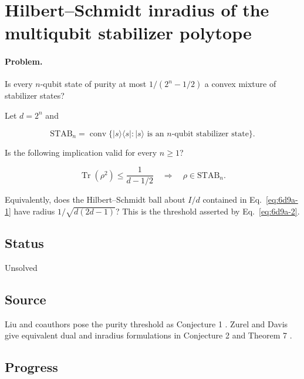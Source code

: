 \section{Hilbert--Schmidt inradius of the multiqubit stabilizer polytope}
\label{sec:op_6d9a72b32070a900}

\paragraph{Problem.}
Is every $n$-qubit state of purity at most $1/(2^n-1/2)$ a convex mixture of stabilizer states?

Let $d=2^n$ and

\begin{equation}
\mathrm{STAB}_n=\operatorname{conv}\{|s\rangle\langle s|:|s\rangle\text{ is an }n\text{-qubit stabilizer state}\}.
\label{eq:6d9a-1}
\end{equation}

Is the following implication valid for every $n\geq1$?

\begin{equation}
\operatorname{Tr}(\rho^2)\leq\frac1{d-1/2}
\quad\Longrightarrow\quad
\rho\in\mathrm{STAB}_n.
\label{eq:6d9a-2}
\end{equation}

Equivalently, does the Hilbert--Schmidt ball about $I/d$ contained in Eq.~\eqref{eq:6d9a-1} have radius $1/\sqrt{d(2d-1)}$? This is the threshold asserted by Eq.~\eqref{eq:6d9a-2}.

\subsection*{Status}

Unsolved

\subsection*{Source}

Liu and coauthors pose the purity threshold as Conjecture 1 . Zurel and Davis give equivalent dual and inradius formulations in Conjecture 2 and Theorem 7 .

\subsection*{Progress}

